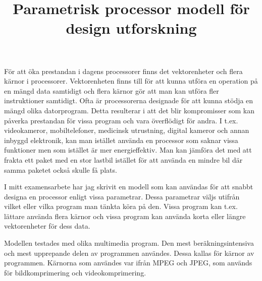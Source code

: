 \documentclass{popsci}
\title{Parametrisk processor modell för design utforskning}
\begin{document}


{\noindent För att öka prestandan i dagens processorer finns det vektorenheter och flera kärnor i processorer. Vektorenheten finns till för att kunna utföra en operation på en mängd data samtidigt och flera kärnor gör att man kan utföra fler instruktioner samtidigt. Ofta är processorerna designade för att kunna stödja en mängd olika datorprogram. Detta resulterar i att det blir kompromisser som kan påverka prestandan för vissa program och vara överflödigt för andra. I t.ex. videokameror, mobiltelefoner, medicinsk utrustning, digital kameror och annan inbyggd elektronik, kan man istället använda en processor som saknar vissa funktioner men som istället är mer energieffektiv. Man kan jämföra det med att frakta ett paket med en stor lastbil istället för att använda en mindre bil där samma paketet också skulle få plats.

I mitt examensarbete har jag skrivit en modell som kan användas för att snabbt designa en processor enligt vissa parametrar. Dessa parametrar väljs utifrån vilket eller vilka program man tänkta köra på den. Vissa program kan t.ex. lättare använda flera kärnor och vissa program kan använda korta eller längre vektorenheter för dess data.

Modellen testades med olika multimedia program. Den mest beräkningsintensiva och mest upprepande delen av programmen användes. Dessa kallas för kärnor av programmen. Kärnorna som användes var ifrån MPEG och JPEG, som används för bildkomprimering och videokomprimering.

}
\end{document}
